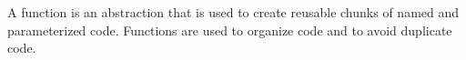 A function is an abstraction that is used to create reusable chunks of named and parameterized code. Functions are used to organize code and to avoid duplicate code.
